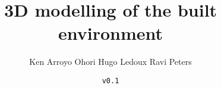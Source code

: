 \documentclass[
  fontsize=10pt, %
  twoside=true, %
  secnumdepth=1, %
  numbers=noenddot, %
]{kaobook}
\begin{document}


\title{3D modelling of the built environment}
\author{Ken Arroyo Ohori \hspace{7mm} Hugo Ledoux \hspace{7mm} Ravi Peters}
\date{\texttt{v0.1}}







% 





\end{document}
